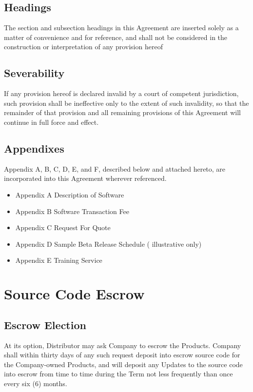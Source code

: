 \documentclass[letterpaper,10pt,english]{sphinxmanual}
\begin{document}
\subsection{Headings}
\label{\detokenize{miscellaneous:headings}}
The section and subsection headings in this Agreement are inserted solely as a matter of convenience and for reference, and shall not be considered in the construction or interpretation of any provision hereof


\subsection{Severability}
\label{\detokenize{miscellaneous:severability}}
If any provision hereof is declared invalid by a court of competent jurisdiction, such provision shall be ineffective only to the extent of such invalidity, so that the remainder of that provision and all remaining provisions of this Agreement will continue in full force and effect.


\subsection{Appendixes}
\label{\detokenize{miscellaneous:appendixes}}
Appendix A, B, C, D, E, and F, described below and attached hereto, are incorporated into this Agreement wherever referenced.
\begin{itemize}
\item {} 
Appendix A    Description of Software

\item {} 
Appendix B    Software Transaction Fee

\item {} 
Appendix C    Request For Quote

\item {} 
Appendix D    Sample Beta Release Schedule ( illustrative only)

\item {} 
Appendix E    Training Service

\end{itemize}


\section{Source Code Escrow}
\label{\detokenize{escrow:source-code-escrow}}\label{\detokenize{escrow::doc}}

\subsection{Escrow Election}
\label{\detokenize{escrow:escrow-election}}
At its option, Distributor may ask Company to escrow the Products.  Company shall within thirty days of any such request deposit into escrow source code for the Company-owned Products, and will deposit any Updates to the source code into escrow from time to time during the Term not less frequently than once every six (6) months.
\end{document}
